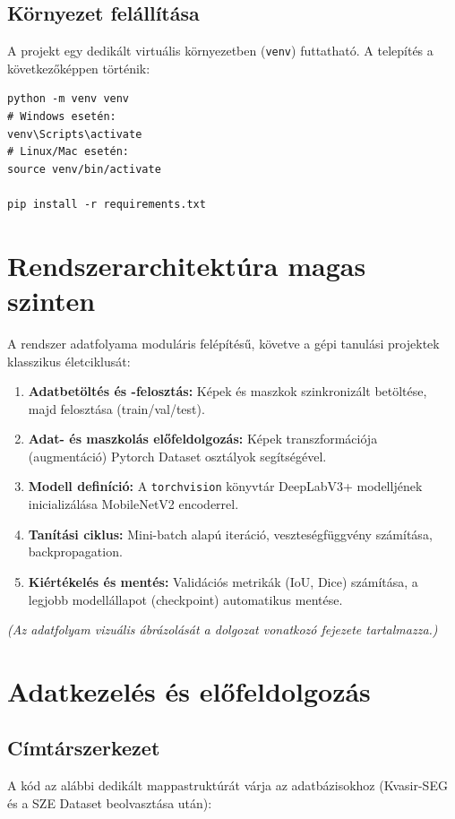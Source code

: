 \documentclass[12pt, a4paper]{report}
\begin{document}
\subsection{Környezet felállítása}
A projekt egy dedikált virtuális környezetben (\texttt{venv}) futtatható. A telepítés a következőképpen történik:
\begin{verbatim}
python -m venv venv
# Windows esetén:
venv\Scripts\activate
# Linux/Mac esetén:
source venv/bin/activate

pip install -r requirements.txt
\end{verbatim}

\section{Rendszerarchitektúra magas szinten}

A rendszer adatfolyama moduláris felépítésű, követve a gépi tanulási projektek klasszikus életciklusát:
\begin{enumerate}
    \item \textbf{Adatbetöltés és -felosztás:} Képek és maszkok szinkronizált betöltése, majd felosztása (train/val/test).
    \item \textbf{Adat- és maszkolás előfeldolgozás:} Képek transzformációja (augmentáció) Pytorch Dataset osztályok segítségével.
    \item \textbf{Modell definíció:} A \texttt{torchvision} könyvtár DeepLabV3+ modelljének inicializálása MobileNetV2 encoderrel.
    \item \textbf{Tanítási ciklus:} Mini-batch alapú iteráció, veszteségfüggvény számítása, backpropagation.
    \item \textbf{Kiértékelés és mentés:} Validációs metrikák (IoU, Dice) számítása, a legjobb modellállapot (checkpoint) automatikus mentése.
\end{enumerate}

\textit{(Az adatfolyam vizuális ábrázolását a dolgozat vonatkozó fejezete tartalmazza.)}

\section{Adatkezelés és előfeldolgozás}

\subsection{Címtárszerkezet}
A kód az alábbi dedikált mappastruktúrát várja az adatbázisokhoz (Kvasir-SEG és a SZE Dataset beolvasztása után):
\end{document}
